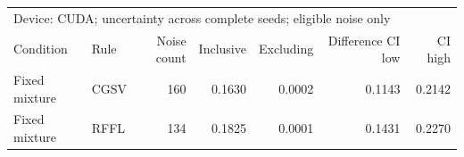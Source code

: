 \begin{tabular}{llrrrrr}
\toprule
\multicolumn{7}{l}{Device: CUDA; uncertainty across complete seeds; eligible noise only} \\
Condition & Rule & Noise count & Inclusive & Excluding & Difference CI low & CI high \\
\midrule
Fixed mixture & CGSV & 160 & 0.1630 & 0.0002 & 0.1143 & 0.2142 \\
Fixed mixture & RFFL & 134 & 0.1825 & 0.0001 & 0.1431 & 0.2270 \\
\bottomrule
\end{tabular}
